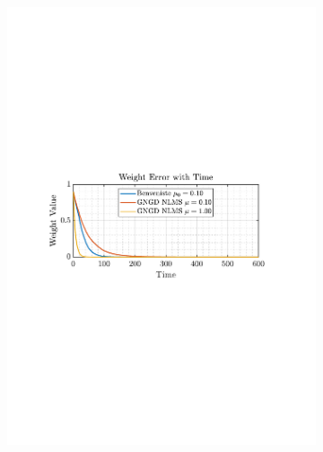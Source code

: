 \documentclass[12pt]{article}
\numberwithin{equation}{section}
\begin{document}
			\begin{figure}[H]
				\centering
				\begin{subfigure}{0.49\textwidth}
					\centering
					\includegraphics[trim={2.2cm 11.2cm 3.15cm  11.2cm}, clip, width=\textwidth]{../MATLAB/figures/q2_2c_fig03.pdf} 
					\captionsetup{justification=centering}
				\end{subfigure}
				\begin{subfigure}{0.49\textwidth}
					\centering

\end{subfigure}
\end{figure}
\end{document}
